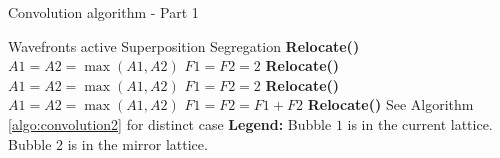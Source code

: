 \documentclass[12pt,english]{article}
\begin{document}
\begin{algorithm}
    \caption{Convolution algorithm - Part 1}
    \label{algo:convolution1}
    \begin{algorithmic}[1]
            \STATE Wavefronts active 
                \STATE Superposition
                    \STATE Segregation
                    \STATE \textbf{Relocate()}
                            \STATE $A1 = A2 = \max(A1, A2)$
                            \STATE $F1 = F2 = 2$
                            \STATE \textbf{Relocate()}
                        \ELSE
                            \STATE $A1 = A2 = \max(A1, A2)$
                            \STATE $F1 = F2 = 2$
                            \STATE \textbf{Relocate()}
                        \ENDIF                            
                    \ENDIF   
                        \STATE $A1 = A2 = \max(A1, A2)$
                        \STATE $F1 = F2 = F1 + F2$
                        \STATE \textbf{Relocate()}
                    \ENDIF   
                \ENDIF   
            \ELSE
                \STATE See Algorithm \ref{algo:convolution2} for distinct case
            \ENDIF   
        \ENDIF   
        \STATE  %
        \STATE \textbf{Legend:}
        \STATE Bubble $1$ is in the current lattice.
        \STATE Bubble $2$ is in the mirror lattice.

    \end{algorithmic}
\end{algorithm}
\end{document}
